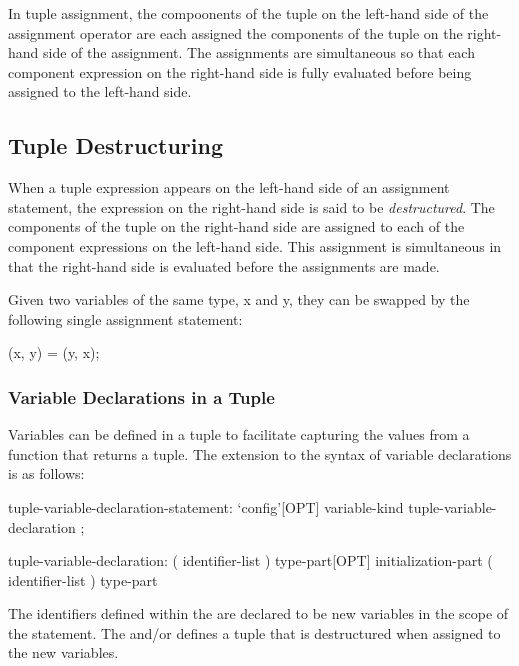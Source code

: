 In tuple assignment, the compoonents of the tuple on the left-hand
side of the assignment operator are each assigned the components of
the tuple on the right-hand side of the assignment.  The assignments
are simultaneous so that each component expression on the right-hand
side is fully evaluated before being assigned to the left-hand side.

\subsection{Tuple Destructuring}
\label{Tuple_Destructuring}

When a tuple expression appears on the left-hand side of an assignment
statement, the expression on the right-hand side is said to be {\em
destructured}.  The components of the tuple on the right-hand side are
assigned to each of the component expressions on the left-hand side.
This assignment is simultaneous in that the right-hand side is
evaluated before the assignments are made.
\begin{example}
Given two variables of the same type, x and y, they can be swapped by
the following single assignment statement:
\begin{chapel}
(x, y) = (y, x);
\end{chapel}
\end{example}

\subsubsection{Variable Declarations in a Tuple}
\label{Variable_Declarations_in_a_Tuple}

Variables can be defined in a tuple to facilitate capturing the values
from a function that returns a tuple.  The extension to the syntax of
variable declarations is as follows:
\begin{syntax}
tuple-variable-declaration-statement:
  `config'[OPT] variable-kind tuple-variable-declaration ;

tuple-variable-declaration:
  ( identifier-list ) type-part[OPT] initialization-part
  ( identifier-list ) type-part
\end{syntax}
The identifiers defined within the  are declared
to be new variables in the scope of the statement.  The
 and/or  defines a tuple
that is destructured when assigned to the new variables.

